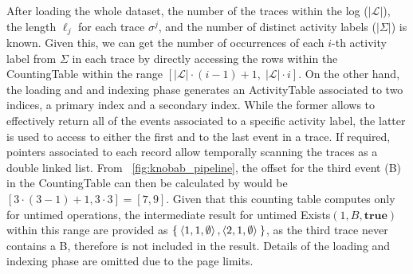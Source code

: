 After loading the whole dataset, the number of the traces within the log ($|\mathcal{L}|$), the length $\ell_j$ for each trace $\sigma^j$, and the number of distinct activity labels ($|\Sigma|$) is known. Given this, we can get the number of occurrences of each $i$-th activity label from $\Sigma$ in each trace by directly accessing the rows within the \textsf{CountingTable} within the range $[|\mathcal{L}|\cdot (i-1) + 1,\; |\mathcal{L}|\cdot i]$.
On the other hand, the loading and and indexing phase generates an \textsf{ActivityTable} associated to two indices, a primary index and a secondary index. While the former allows to effectively return all of the events associated to a specific activity label, the latter is used to access to either the first and to the last event in a trace. If required, pointers associated to each record allow temporally scanning the traces as a double linked list. From \figurename~\ref{fig:knobab_pipeline}, the offset for the third event (B) in the \textsf{CountingTable} can then be calculated by would be $[3 \cdot (3-1) + 1, 3 \cdot 3] = [7,9]$. Given that this counting table computes only for untimed operations, the intermediate result for untimed \textsf{Exists}$(1,B,\textbf{true})$ within this range are provided as $\Set{\braket{1,1,\emptyset}, \braket{2,1,\emptyset}}$, as the third trace never contains a B, therefore is not included in the result.
Details of the loading and indexing phase are omitted due to the page limits.



